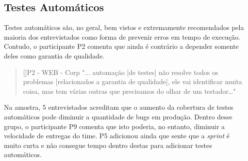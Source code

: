 \subsection{Testes Automáticos}

Testes automáticos são, no geral, bem vistos e extremamente recomendados pela maioria dos entrevistados como forma de prevenir erros em tempo de execução. Contudo, o participante P2 comenta que ainda é contrário a depender somente deles como garantia de qualidade.

\begin{quotation}[]{P2 - WEB - Corp}
    "... automação [de testes] não resolve todos os problemas [relacionados a garantia de qualidade], ele vai identificar muita coisa, mas tem várias outras que precisamos do olhar de um testador…"
\end{quotation}

Na amostra, 5 entrevistados acreditam que o aumento da cobertura de testes automáticos pode diminuir a quantidade de bugs em produção. Dentro desse grupo, o participante P9 comenta que isto poderia, no entanto, diminuir a velocidade de entregas do time. P5 adicionou ainda que sente que a \emph{sprint} é muito curta e não consegue tempo dentro destas para adicionar testes automáticos.
